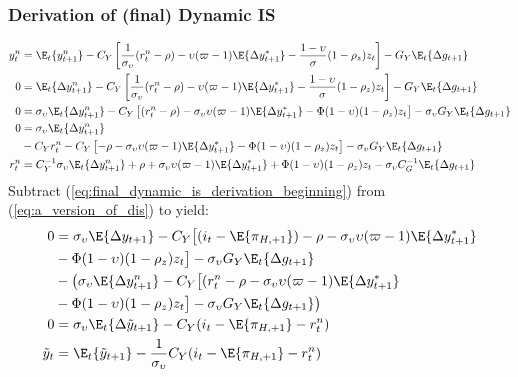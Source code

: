 \subsubsection{Derivation of (final) Dynamic IS}
\begin{align}\label{eq:final_dynamic_is_derivation_beginning}
    y^n_t  &= \E_t \{y^n_{t+1}\} - C_Y\left[\frac{1}{\sigma_\upsilon}(r^n_t - \rho) - \upsilon (\varpi - 1)\E \{\Delta y_{t+1}^* \}  - \frac{1-\upsilon}{\sigma} (1-\rho_z)z_t\right] - G_Y \E_t \{ \Delta g_{t+1} \}\\
    0  &= \E_t \{\Delta y^n_{t+1}\} - C_Y\left[\frac{1}{\sigma_\upsilon}(r^n_t - \rho) - \upsilon (\varpi - 1)\E \{\Delta y_{t+1}^* \}  - \frac{1-\upsilon}{\sigma} (1-\rho_z)z_t\right] - G_Y \E_t \{ \Delta g_{t+1} \}\\
    0  &= \sigma_\upsilon \E_t \{\Delta y^n_{t+1}\} - C_Y\left[(r^n_t - \rho) - \sigma_\upsilon \upsilon (\varpi - 1)\E \{\Delta y_{t+1}^* \}  - \Phi (1-\upsilon)(1-\rho_z)z_t\right] - \sigma_\upsilon G_Y \E_t \{ \Delta g_{t+1} \}\\
    0  &= \sigma_\upsilon \E_t \{\Delta y^n_{t+1}\} \nonumber \\ 
        &- C_Y r^n_t - C_Y\left[-\rho - \sigma_\upsilon \upsilon (\varpi - 1)\E \{\Delta y_{t+1}^* \}  - \Phi (1-\upsilon)(1-\rho_z)z_t\right] - \sigma_\upsilon G_Y \E_t \{ \Delta g_{t+1} \}\\
    r^n_t  &= C_Y^{-1}\sigma_\upsilon \E_t \{\Delta y^n_{t+1}\} + \rho + \sigma_\upsilon \upsilon (\varpi - 1)\E \{\Delta y_{t+1}^* \}  + \Phi (1-\upsilon)(1-\rho_z)z_t - \sigma_\upsilon C_G^{-1}\E_t \{ \Delta g_{t+1} \} \label{eq:appendix_natural_rate_of_interest_dynamic_is}
\end{align}
Subtract (\ref{eq:final_dynamic_is_derivation_beginning}) from (\ref{eq:a_version_of_dis}) to yield:
\begin{align}
    0 &= \sigma_\upsilon \E \{\Delta y_{t+1} \} - C_Y\big[(i_t - \E \{ \pi_{H,+1}\}) - \rho - \sigma_\upsilon \upsilon (\varpi - 1)\E \{\Delta y_{t+1}^* \} \nonumber \\ 
    &- \Phi(1-\upsilon) (1-\rho_z)z_t \big] - \sigma_\upsilon G_Y \E_t \{ \Delta g_{t+1} \} \nonumber \\
    &- \big(\sigma_\upsilon \E \{\Delta y_{t+1}^n \} - C_Y\big[(r^n_t - \rho - \sigma_\upsilon \upsilon (\varpi - 1)\E \{\Delta y_{t+1}^* \} \nonumber \\ 
    &- \Phi(1-\upsilon) (1-\rho_z)z_t \big] - \sigma_\upsilon G_Y \E_t \{ \Delta g_{t+1} \} \big) \\
    0 &= \sigma_\upsilon \E_t \{\Delta \tilde{y}_{t+1} \} - C_Y(i_t - \E \{ \pi_{H,+1}\} - r^n_t)\\
    \tilde{y}_t &= \E_t\{\tilde{y}_{t+1}\} - \frac{1}{\sigma_\upsilon}C_Y(i_t - \E \{ \pi_{H,+1}\} - r^n_t) \label{eq:final_dynamic_is_derivation_end}
\end{align}